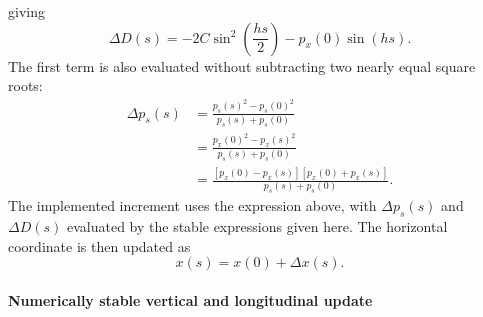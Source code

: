 giving
\begin{equation}
\Delta D(s)
=
-2C\sin^2\left(\frac{hs}{2}\right)-p_x(0)\sin(hs).
\end{equation}
The first term is also evaluated without subtracting two nearly equal square
roots:
\begin{align}
\Delta p_s(s)
&=
\frac{p_s(s)^2-p_s(0)^2}{p_s(s)+p_s(0)} \\
&=
\frac{p_x(0)^2-p_x(s)^2}{p_s(s)+p_s(0)} \\
&=
\frac{\left[p_x(0)-p_x(s)\right]\left[p_x(0)+p_x(s)\right]}
{p_s(s)+p_s(0)}.
\end{align}
The implemented increment uses the expression above, with
\(\Delta p_s(s)\) and \(\Delta D(s)\) evaluated by the stable expressions
given here.
The horizontal coordinate is then updated as
\begin{equation}
x(s) = x(0) + \Delta x(s).
\end{equation}

\paragraph{Numerically stable vertical and longitudinal update}

